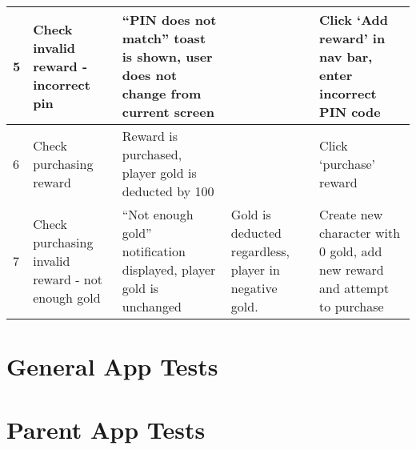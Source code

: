 \begin{landscape}
\begin{tabularx}{\linewidth}{p{1cm} X X X X}
5            & Check invalid reward - incorrect pin              & ``PIN does not match'' toast is shown, user does not change from current screen         &                                                       & Click `Add reward' in nav bar, enter incorrect PIN code                             \\ \hline
6            & Check purchasing reward                           & Reward is purchased, player gold is deducted by 100                                     &                                                       & Click `purchase' reward                                                             \\ \hline
7            & Check purchasing invalid reward - not enough gold & ``Not enough gold'' notification displayed, player gold is unchanged                    & Gold is deducted regardless, player in negative gold. & Create new character with 0 gold, add new reward and attempt to purchase            \\ \hline
\end{tabularx} 

\section{General App Tests}

\section{Parent App Tests}

\end{landscape}